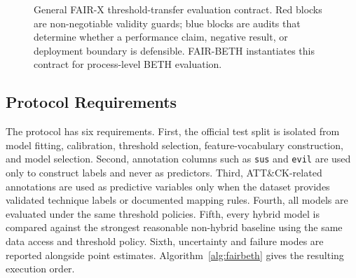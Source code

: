 \documentclass[10pt,journal,compsoc]{IEEEtran}
\begin{document}
\begin{figure}[t]
{
}
\caption{General FAIR-X threshold-transfer evaluation contract. Red blocks are non-negotiable validity guards; blue blocks are audits that determine whether a performance claim, negative result, or deployment boundary is defensible. FAIR-BETH instantiates this contract for process-level BETH evaluation.}
\label{fig:fairx_protocol}
\end{figure}

\subsection{Protocol Requirements}

The protocol has six requirements. First, the official test split is isolated from model fitting, calibration, threshold selection, feature-vocabulary construction, and model selection. Second, annotation columns such as \texttt{sus} and \texttt{evil} are used only to construct labels and never as predictors. Third, ATT\&CK-related annotations are used as predictive variables only when the dataset provides validated technique labels or documented mapping rules. Fourth, all models are evaluated under the same threshold policies. Fifth, every hybrid model is compared against the strongest reasonable non-hybrid baseline using the same data access and threshold policy. Sixth, uncertainty and failure modes are reported alongside point estimates. Algorithm~\ref{alg:fairbeth} gives the resulting execution order.
\end{document}

